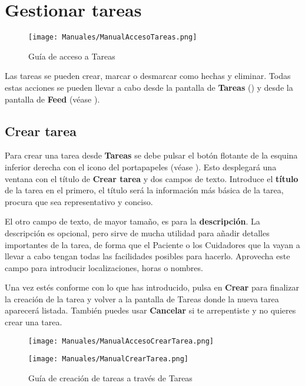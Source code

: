 \section{Gestionar tareas}

\begin{figure}[H]
    \centering
    \texttt{[image: Manuales/ManualAccesoTareas.png]}
    \caption{Guía de acceso a Tareas}
    \label{man:tareas}
\end{figure}

Las tareas se pueden crear, marcar o desmarcar como hechas y eliminar. Todas estas acciones se pueden llevar a cabo desde la pantalla de \textbf{Tareas} () y desde la pantalla de \textbf{Feed} (véase ).

\subsection{Crear tarea}

Para crear una tarea desde \textbf{Tareas} se debe pulsar el botón flotante de la esquina inferior derecha con el icono del portapapeles (véase ). Esto desplegará una ventana con el título de \textbf{Crear tarea} y dos campos de texto. Introduce el \textbf{título} de la tarea en el primero, el título será la información más básica de la tarea, procura que sea representativo y conciso. 

El otro campo de texto, de mayor tamaño, es para la \textbf{descripción}. La descripción es opcional, pero sirve de mucha utilidad para añadir detalles importantes de la tarea, de forma que el Paciente o los Cuidadores que la vayan a llevar a cabo tengan todas las facilidades posibles para hacerlo. Aprovecha este campo para introducir localizaciones, horas o nombres.

Una vez estés conforme con lo que has introducido, pulsa en \textbf{Crear} para finalizar la creación de la tarea y volver a la pantalla de Tareas donde la nueva tarea aparecerá listada. También puedes usar \textbf{Cancelar} si te arrepentiste y no quieres crear una tarea.

\begin{figure}[H]
    \centering
    \begin{minipage}{0.5\textwidth}
        \centering
        \texttt{[image: Manuales/ManualAccesoCrearTarea.png]}
    \end{minipage}\hfill
    \begin{minipage}{0.5\textwidth}
        \centering
        \texttt{[image: Manuales/ManualCrearTarea.png]}
    \end{minipage}\hfill
    \caption{Guía de creación de tareas a través de Tareas}
    \label{man:crear_tarea}
\end{figure}

